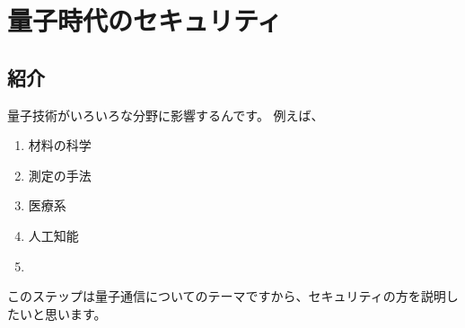 \section{量子時代のセキュリティ}
\subsection{紹介}
量子技術がいろいろな分野に影響するんです。
例えば、
\begin{enumerate}
    \item 材料の科学
    \item 測定の手法
    \item 医療系
    \item 人工知能
    \item
\end{enumerate}
このステップは量子通信についてのテーマですから、セキュリティの方を説明したいと思います。

